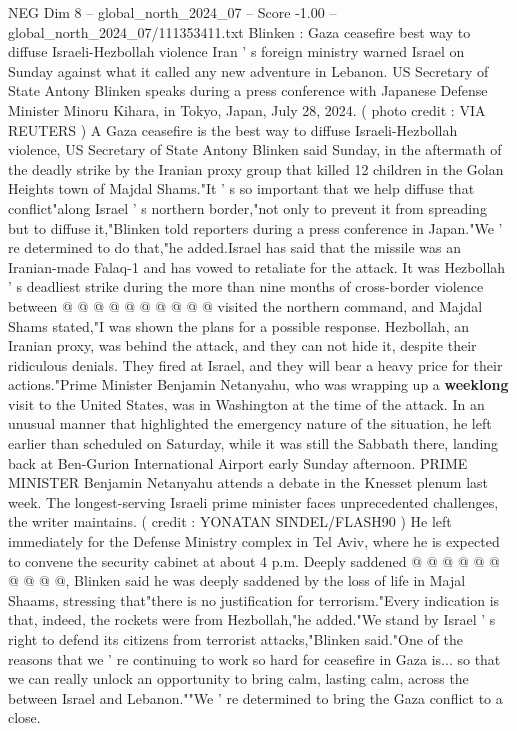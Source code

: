 \begin{textsample}{NEG Dim 8 – global\_north\_2024\_07 – Score -1.00 – global\_north\_2024\_07/111353411.txt}  \label{ex:f8_neg_186}
Blinken : Gaza ceasefire best way to diffuse Israeli-Hezbollah violence Iran ' s foreign ministry warned Israel on Sunday against what it called any new adventure in Lebanon.
US Secretary of State Antony Blinken speaks during a press conference with Japanese Defense Minister Minoru Kihara, in Tokyo, Japan, July 28, 2024. ( photo credit : VIA REUTERS ) A Gaza ceasefire is the best way to diffuse Israeli-Hezbollah violence, US Secretary of State Antony Blinken said Sunday, in the aftermath of the deadly strike by the Iranian proxy group that killed 12 children in the Golan Heights town of Majdal Shams."It ' s so important that we help diffuse that conflict"along Israel ' s northern border,"not only to prevent it from spreading but to diffuse it,"Blinken told reporters during a press conference in Japan."We ' re determined to do that,"he added.Israel has said that the missile was an Iranian-made Falaq-1 and has vowed to retaliate for the attack.
It was Hezbollah ' s deadliest strike during the more than nine months of cross-border violence between @ @ @ @ @ @ @ @ @ @ visited the northern command, and Majdal Shams stated,"I was shown the plans for a possible response.
Hezbollah, an Iranian proxy, was behind the attack, and they can not hide it, despite their ridiculous denials.
They fired at Israel, and they will bear a heavy price for their actions."Prime Minister Benjamin Netanyahu, who was wrapping up a \textbf{weeklong} visit to the United States, was in Washington at the time of the attack.
In an unusual manner that highlighted the emergency nature of the situation, he left earlier than scheduled on Saturday, while it was still the Sabbath there, landing back at Ben-Gurion International Airport early Sunday afternoon.
PRIME MINISTER Benjamin Netanyahu attends a debate in the Knesset plenum last week.
The longest-serving Israeli prime minister faces unprecedented challenges, the writer maintains. ( credit : YONATAN SINDEL/FLASH90 ) He left immediately for the Defense Ministry complex in Tel Aviv, where he is expected to convene the security cabinet at about 4 p.m.
Deeply saddened @ @ @ @ @ @ @ @ @ @, Blinken said he was deeply saddened by the loss of life in Majal Shaams, stressing that"there is no justification for terrorism."Every indication is that, indeed, the rockets were from Hezbollah,"he added."We stand by Israel ' s right to defend its citizens from terrorist attacks,"Blinken said."One of the reasons that we ' re continuing to work so hard for ceasefire in Gaza is... so that we can really unlock an opportunity to bring calm, lasting calm, across the between Israel and Lebanon.""We ' re determined to bring the Gaza conflict to a close.

\end{textsample}
